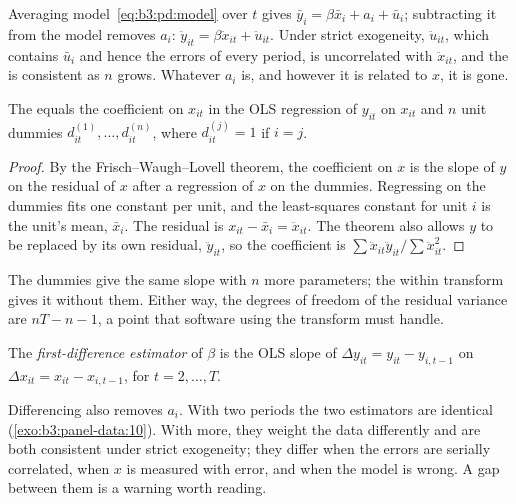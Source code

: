 Averaging model~\eqref{eq:b3:pd:model} over $t$ gives $\bar y_i = \beta \bar
x_i + a_i + \bar u_i$; subtracting it from the model removes $a_i$:
$\ddot y_{it} = \beta \ddot x_{it} + \ddot u_{it}$. Under strict exogeneity,
$\ddot u_{it}$, which contains $\bar u_i$ and hence the errors of every period,
is uncorrelated with $\ddot x_{it}$, and the  is consistent as
$n$ grows. Whatever $a_i$ is, and however it is related to $x$, it is gone.

\begin{proposition}\label{prop:b3:panel-data:dummies}
The  equals the coefficient on $x_{it}$ in the OLS regression of
$y_{it}$ on $x_{it}$ and $n$ unit dummies $d^{(1)}_{it}, \dots, d^{(n)}_{it}$,
where $d^{(j)}_{it} = 1$ if $i = j$.
\end{proposition}

\begin{proof}
By the Frisch--Waugh--Lovell theorem, the coefficient on $x$ is the slope of $y$
on the residual of $x$ after a regression of $x$ on the dummies. Regressing on the
dummies fits one constant per unit, and the least-squares constant for unit $i$
is the unit's mean, $\bar x_i$. The residual is $x_{it} - \bar x_i = \ddot
x_{it}$. The theorem also allows $y$ to be replaced by its own residual, $\ddot
y_{it}$, so the coefficient is $\sum \ddot x_{it} \ddot y_{it} / \sum \ddot
x_{it}^2$.
\end{proof}

The dummies give the same slope with $n$ more parameters; the within transform
gives it without them. Either way, the degrees of freedom of the residual
variance are $nT - n - 1$, a point that software using the transform must
handle.

\begin{definition}\label{def:b3:panel-data:first-difference}
The \emph{first-difference estimator} of $\beta$ is the OLS slope of $\Delta
y_{it} = y_{it} - y_{i,t-1}$ on $\Delta x_{it} = x_{it} - x_{i,t-1}$, for $t =
2, \dots, T$.
\end{definition}

Differencing also removes $a_i$. With two periods the two estimators are
identical (\cref{exo:b3:panel-data:10}). With more, they weight the data
differently and are both consistent under strict exogeneity; they differ when
the errors are serially correlated, when $x$ is measured with error, and when
the model is wrong. A gap between them is a warning worth reading.

